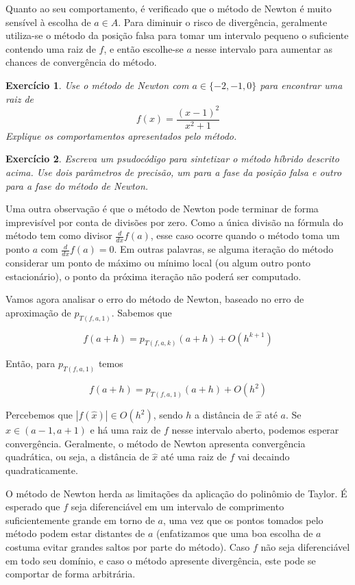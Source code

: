 \documentclass[]{article}
\newtheorem{exercicio}{Exercício}
\numberwithin{equation}{section}
\begin{document}
Quanto ao seu comportamento, é verificado que o método de Newton é
muito sensível à escolha de $a \in A$. Para diminuir o risco de
divergência, geralmente utiliza-se o método da posição falsa para
tomar um intervalo pequeno o suficiente contendo uma raiz de $f$, e
então escolhe-se $a$ nesse intervalo para aumentar as chances de
convergência do método.

\begin{exercicio}
  Use o método de Newton com $a \in \{-2, -1, 0\}$ para encontrar uma
  raiz de $$f(x) = \frac{(x - 1)^2}{x^2 + 1}$$ Explique os
  comportamentos apresentados pelo método.
\end{exercicio}

\begin{exercicio}
  Escreva um psudocódigo para sintetizar o método híbrido descrito
  acima. Use dois parâmetros de precisão, um para a fase da posição
  falsa e outro para a fase do método de Newton.
\end{exercicio}

Uma outra observação é que o método de Newton pode terminar de forma
imprevisível por conta de divisões por zero. Como a única divisão na
fórmula do método tem como divisor $\frac{d}{dx} f(a)$, esse caso
ocorre quando o método toma um ponto $a$ com $\frac{d}{dx} f(a) =
0$. Em outras palavras, se alguma iteração do método considerar um
ponto de máximo ou mínimo local (ou algum outro ponto estacionário), o
ponto da próxima iteração não poderá ser computado.

Vamos agora analisar o erro do método de Newton, baseado no erro de
aproximação de $p_{T(f, a, 1)}$. Sabemos que

$$
f(a + h) = p_{T(f, a, k)}(a + h) + O(h^{k + 1})
$$

Então, para $p_{T(f, a, 1)}$ temos

$$
f(a + h) = p_{T(f, a, 1)}(a + h) + O(h^2)
$$

Percebemos que $|f(\hat{x})|\in O(h^2)$, sendo $h$ a distância de
$\hat{x}$ até $a$. Se $\hat{x} \in (a - 1, a + 1)$ e há uma raiz de
$f$ nesse intervalo aberto, podemos esperar convergência. Geralmente,
o método de Newton apresenta convergência quadrática, ou seja, a
distância de $\hat{x}$ até uma raiz de $f$ vai decaindo
quadraticamente.

O método de Newton herda as limitações da aplicação do polinômio de
Taylor. É esperado que $f$ seja diferenciável em um intervalo de
comprimento suficientemente grande em torno de $a$, uma vez que os
pontos tomados pelo método podem estar distantes de $a$ (enfatizamos
que uma boa escolha de $a$ costuma evitar grandes saltos por parte do
método). Caso $f$ não seja diferenciável em todo seu domínio, e caso o
método apresente divergência, este pode se comportar de forma
arbitrária.
\end{document}
